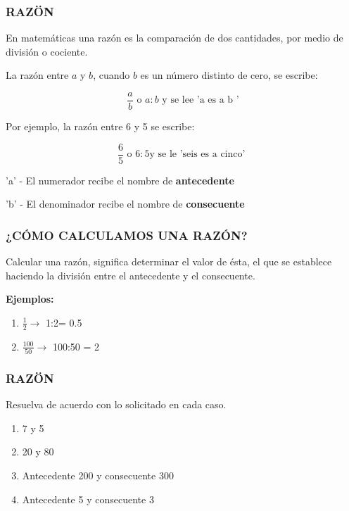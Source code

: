 \begin{frame}
    \frametitle{RAZÖN}

En matemáticas una razón es la comparación de dos cantidades, por medio de división o cociente. 

\hfill

La razón entre $a$ y $b$, cuando $b$ es un número distinto de 
cero, se escribe:

$$
\frac{a}{b} \text{   o } a:b \text{ y se lee 'a es a b '}
$$

Por ejemplo, la razón entre 6 y 5 se escribe:

$$
\frac{6}{5} \text{ o } 6:5 \text{y se le 'seis es a cinco' }
$$

{\color{red} 'a'} - El numerador recibe el nombre de {\color{red} \textbf{antecedente}}

\hfill

{\color{red} 'b'} - El denominador recibe el nombre de {\color{red} \textbf{consecuente}}

\end{frame}


\begin{frame}
    \frametitle{¿CÓMO CALCULAMOS UNA RAZÓN?}

Calcular una razón, significa determinar el valor de ésta, el que se establece haciendo la división
entre el antecedente y el consecuente.

\hfill

\textbf{Ejemplos:}

\hfill

\begin{enumerate}
\item $\frac{1}{2} \to $ 1:2= 0.5 
\item $\frac{100}{50} \to $ 100:50 = 2
\end{enumerate}

\end{frame}


\begin{frame}
    \frametitle{RAZÖN}

Resuelva de acuerdo con lo solicitado en cada caso.

\begin{enumerate}
\item 7 y 5
\item 20 y 80
\item Antecedente 200 y consecuente 300
\item Antecedente 5 y consecuente 3
\end{enumerate}

\end{frame}

